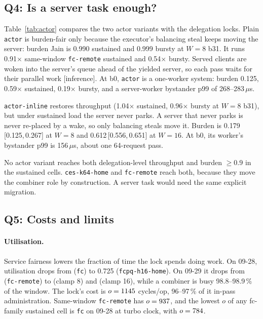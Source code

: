 \documentclass[10pt,twocolumn]{article}
\newcommand{\lk}[1]{\texttt{#1}}
\newcommand{\rng}[2]{{\scriptsize\,[#1,\,#2]}}
\begin{document}
\subsection{Q4: Is a server task enough?}\label{sec:q4}

\begin{table}[t]
\centering\footnotesize
{}
\caption{Actor control. Upper blocks: same-window (09-29) references.
  Lower blocks: b0 and $W{=}16$, where the \lk{fc-remote} reference is a
  stored 09-28 cell. Ratios marked $\dagger$ cross windows (actor 09-29 vs.\ reference 09-28) and understate the actor rows
  by up to about 3\,\%.}
\label{tab:actor}
\end{table}

Table~\ref{tab:actor} compares the two actor variants with the delegation
locks. Plain \lk{actor} is burden-fair only because the executor's balancing
steal keeps moving the server: burden Jain is 0.990 sustained and 0.999 bursty
at $W{=}8$ b31. It runs 0.91$\times$ same-window \lk{fc-remote} sustained and
0.54$\times$ bursty. Served clients are woken into the server's queue ahead of
the yielded server, so each pass waits for their parallel work [inference].
At b0, \lk{actor} is a one-worker system: burden 0.125, 0.59$\times$ sustained,
0.19$\times$ bursty, and a server-worker bystander p99 of 268--283\,$\mu$s.

\lk{actor-inline} restores throughput (1.04$\times$ sustained, 0.96$\times$
bursty at $W{=}8$ b31), but under sustained load the server never parks. A
server that never parks is never re-placed by a wake, so only balancing steals
move it. Burden is 0.179\rng{0.125}{0.267} at $W{=}8$ and
0.612\rng{0.556}{0.651} at $W{=}16$. At b0, its worker's bystander p99 is
156\,$\mu$s, about one 64-request pass.

No actor variant reaches both delegation-level throughput and burden
$\ge0.9$ in the sustained cells. \lk{ces-k64-home} and \lk{fc-remote} reach
both, because they move the combiner role by construction. A server task would
need the same explicit migration.

\subsection{Q5: Costs and limits}\label{sec:q5}

\paragraph{Utilisation.} Service fairness lowers the fraction of time the
lock spends doing work. On 09-28, utilisation drops from \UtilFcOld{}
(\lk{fc}) to 0.725 (\lk{fcpq-h16-home}). On 09-29 it drops from
\UtilFcRemoteAB{} (\lk{fc-remote}) to \UtilCEight{} (clamp 8) and
\UtilCSixteen{} (clamp 16), while a combiner is busy 98.8--98.9\,\% of the
window. The lock's cost is $o=1145$ cycles/op, 96--97\,\% of it in-pass
administration. Same-window \lk{fc-remote} has $o=937$, and the
lowest $o$ of any fc-family sustained cell is \lk{fc} on 09-28 at turbo clock,
with $o=784$.
\end{document}
